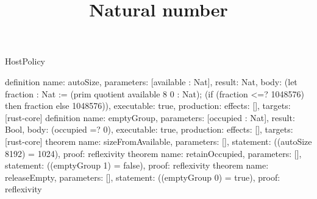 \begin{lexlean}{HostPolicy}
\title{Natural number}
\begin{semanticmodule}
definition{
  name: autoSize, parameters: [available : Nat], result: Nat,
  body: (let fraction : Nat := (prim quotient available 8 0 : Nat); (if (fraction <=? 1048576) then fraction else 1048576)),
  executable: true, production: {effects: [], targets: [rust-core]}
}
definition{
  name: emptyGroup, parameters: [occupied : Nat], result: Bool,
  body: (occupied =? 0),
  executable: true, production: {effects: [], targets: [rust-core]}
}
theorem{ name: sizeFromAvailable, parameters: [], statement: ((autoSize 8192) = 1024), proof: reflexivity{} }
theorem{ name: retainOccupied, parameters: [], statement: ((emptyGroup 1) = false), proof: reflexivity{} }
theorem{ name: releaseEmpty, parameters: [], statement: ((emptyGroup 0) = true), proof: reflexivity{} }
\end{semanticmodule}
\end{lexlean}

